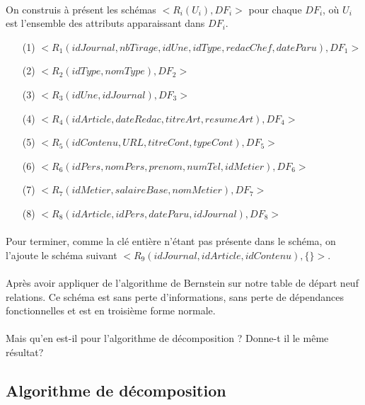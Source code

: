 \paragraph{}{
    On construis à présent les schémas $<R_{i}(U_{i}), DF_{i}>$ pour chaque $DF_{i}$, où $U_{i}$ est l'ensemble des attributs apparaissant dans $DF_{i}$.
}
\begin{enumerate}
    \item[(1)] $<R_{1}(idJournal, nbTirage, idUne, idType, redacChef, dateParu), DF_{1}>$
    \item[(2)] $<R_{2}(idType, nomType),DF_{2}>$
    \item[(3)] $<R_{3}(idUne, idJournal),DF_{3}>$
    \item[(4)] $<R_{4}(idArticle, dateRedac, titreArt, resumeArt),DF_{4}>$
    \item[(5)] $<R_{5}(idContenu, URL, titreCont, typeCont),DF_{5}>$
    \item[(6)] $<R_{6}(idPers, nomPers, prenom, numTel, idMetier),DF_{6}>$
    \item[(7)] $<R_{7}(idMetier, salaireBase, nomMetier),DF_{7}>$
    \item[(8)] $<R_{8}(idArticle, idPers, dateParu, idJournal),DF_{8}>$
\end{enumerate}

\paragraph{}{
    Pour terminer, comme la clé entière n'étant pas présente dans le schéma, on l'ajoute le schéma suivant $<R_{9}(idJournal, idArticle, idContenu), \{\}>$.
}

\paragraph{}{
    Après avoir appliquer de l'algorithme de Bernstein sur notre table de départ neuf relations. Ce schéma est sans perte d'informations, sans perte de dépendances fonctionnelles et est en troisième forme normale.
}

\paragraph{}{
    Mais qu'en est-il pour l'algorithme de décomposition ? Donne-t il le même résultat?
}

\subsection{Algorithme de décomposition}
